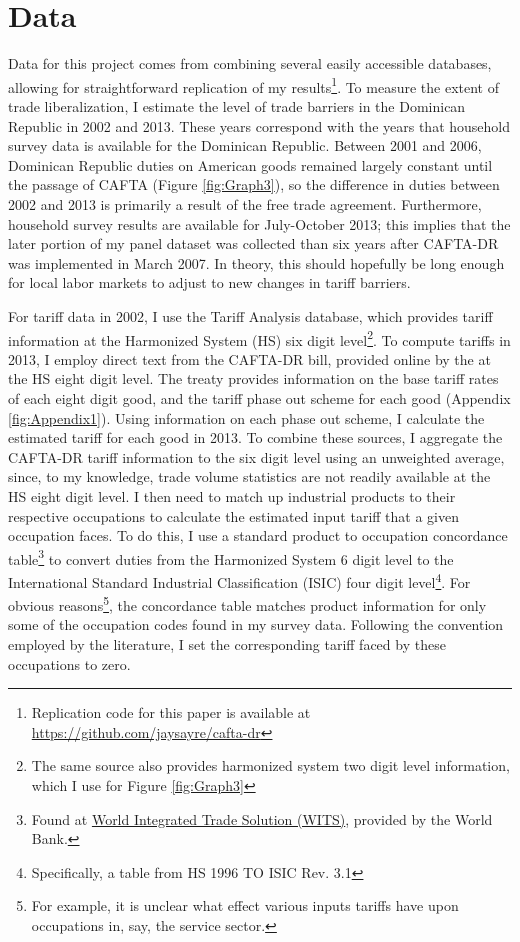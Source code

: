 \documentclass[12pt]{article}
\begin{document}
\section{Data}
\label{sec:Data}
Data for this project comes from combining several easily accessible databases, allowing
for straightforward replication of my results\footnote{Replication code for this paper is available
at \url{https://github.com/jaysayre/cafta-dr}}.
To measure the extent of trade liberalization, I estimate the level of trade barriers in the
Dominican Republic in 2002 and 2013. These years correspond with the years that household
survey data is available for the Dominican Republic. 
Between 2001 and 2006, Dominican Republic duties on American goods 
remained largely constant until the passage of CAFTA (Figure \ref{fig:Graph3}), so the 
difference in duties between 2002 and 2013 is primarily a result of the free trade agreement.
Furthermore, household survey results are available for July-October 2013; this implies
that the later portion of my panel dataset was collected than six years after CAFTA-DR was implemented 
in March 2007. In theory, this should hopefully be long enough for local labor markets to adjust 
to new changes in tariff barriers.

For tariff data in 2002, 
I use the \citet{wtotariff} Tariff Analysis database, which provides tariff information 
at the Harmonized System (HS) six digit level\footnote{The same source
also provides harmonized system two digit level information,
which I use for Figure \ref{fig:Graph3}}. To compute tariffs in 2013, 
I employ direct text from the CAFTA-DR bill, provided online by the 
\citet{ustraderep} at the HS eight digit level. The treaty provides
information on the base tariff rates of each eight digit good, and the tariff phase out
scheme for each good (Appendix \ref{fig:Appendix1}).
Using information on each phase out scheme, I calculate the estimated tariff
for each good in 2013. To combine these sources, I aggregate
the CAFTA-DR tariff information to the six digit level using an unweighted average, 
since, to my knowledge, trade volume statistics are not readily available at the HS eight digit level.
I then need to match up industrial products to their respective occupations to calculate
the estimated input tariff that a given occupation faces. 
To do this, I use a standard product to occupation concordance table\footnote{Found at 
\href{http://wits.worldbank.org/product_concordance.html}{World Integrated Trade Solution (WITS)}, 
provided by the World Bank.} to convert duties from the Harmonized System 6 digit level to the 
International Standard Industrial Classification (ISIC) four digit 
level\footnote{Specifically, a table from HS 1996 TO ISIC Rev. 3.1}.
For obvious reasons\footnote{For example, it is unclear what effect various inputs tariffs have
upon occupations in, say, the service sector.}, the concordance table matches product information
for only some of the occupation codes found in my survey data. Following the convention employed 
by the literature, I set the corresponding tariff faced by these occupations to zero.
\end{document}
